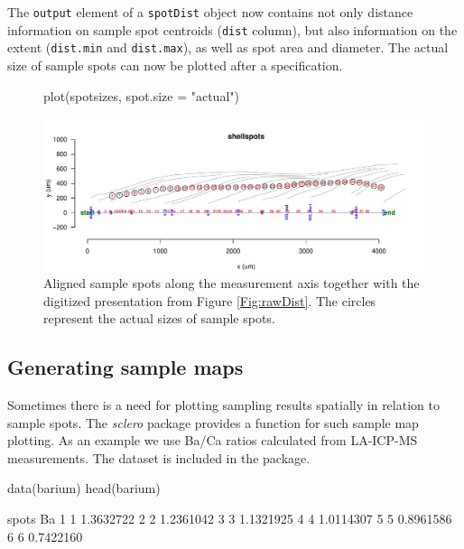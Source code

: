 \documentclass[11pt, a4paper]{article}
\newcommand{\sclero}{\textit{sclero}\xspace}
\begin{document}
The \texttt{output} element of a \texttt{spotDist} object now contains not only distance information on sample spot centroids (\texttt{dist} column), but also information on the extent (\texttt{dist.min} and \texttt{dist.max}), as well as spot area and diameter. The actual size of sample spots can now be plotted after a specification.

\begin{figure}[H]
\begin{center}
\begin{Schunk}
\begin{Sinput}
 plot(spotsizes, spot.size = "actual")
\end{Sinput}
\end{Schunk}
\includegraphics{sclero_tutorial-plotsize}
\end{center}
\caption{Aligned sample spots along the measurement axis together with the digitized presentation from Figure \ref{Fig:rawDist}. The circles represent the actual sizes of sample spots.}
\end{figure}

\clearpage
\subsection{Generating sample maps} \label{sec:maps}

Sometimes there is a need for plotting sampling results spatially in relation to sample spots. The \sclero package provides a function for such sample map plotting. As an example we use Ba/Ca ratios calculated from LA-ICP-MS measurements. The dataset is included in the package.

\begin{Schunk}
\begin{Sinput}
 data(barium)
 head(barium)
\end{Sinput}
\begin{Soutput}
  spots        Ba
1     1 1.3632722
2     2 1.2361042
3     3 1.1321925
4     4 1.0114307
5     5 0.8961586
6     6 0.7422160
\end{Soutput}
\end{Schunk}
\end{document}
